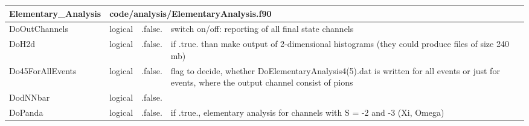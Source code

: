 \documentclass{article}
\begin{document}

\begin{longtable}{llll}
\toprule
\textbf{\large{Elementary\_Analysis}} & \multicolumn{3}{l}{\footnotesize{code/analysis/ElementaryAnalysis.f90}}\\*
\midrule
\endfirsthead
\midrule
\endhead
DoOutChannels & \begin{minipage}[t]{2cm}logical\end{minipage} & \begin{minipage}[t]{2cm}.false.\end{minipage} & \begin{minipage}[t]{12cm}switch on/off: reporting of all final state channels\end{minipage}\\*
\midrule
DoH2d & \begin{minipage}[t]{2cm}logical\end{minipage} & \begin{minipage}[t]{2cm}.false.\end{minipage} & \begin{minipage}[t]{12cm}if .true. than make output of 2-dimensional histograms (they could produce files of size 240 mb)\end{minipage}\\*
\midrule
Do45ForAllEvents & \begin{minipage}[t]{2cm}logical\end{minipage} & \begin{minipage}[t]{2cm}.false.\end{minipage} & \begin{minipage}[t]{12cm}flag to decide, whether DoElementaryAnalysis4(5).dat is written for all events or just for events, where the output channel consist of pions\end{minipage}\\*
\midrule
DodNNbar & \begin{minipage}[t]{2cm}logical\end{minipage} & \begin{minipage}[t]{2cm}.false.\end{minipage} & \begin{minipage}[t]{12cm}\end{minipage}\\*
\midrule
DoPanda & \begin{minipage}[t]{2cm}logical\end{minipage} & \begin{minipage}[t]{2cm}.false.\end{minipage} & \begin{minipage}[t]{12cm}if .true., elementary analysis for channels with S = -2 and -3 (Xi, Omega)\end{minipage}\\*

\end{longtable}
\end{document}
